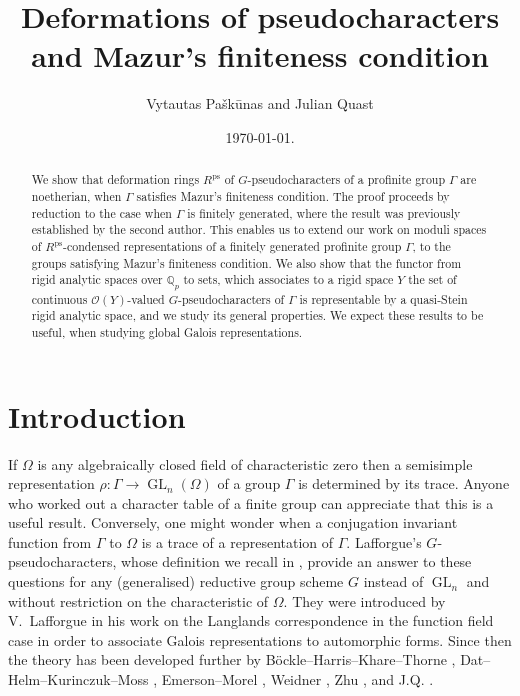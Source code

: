 \documentclass{amsart}
\title[Deformations of pseudocharacters]{Deformations of pseudocharacters and Mazur's finiteness condition}
\author{Vytautas Pa\v{s}k\={u}nas and  Julian Quast }
\date{\today.}
\theoremstyle{definition}
\theoremstyle{remark}
\DeclareMathOperator{\GL}{GL}
\newcommand{\Qp}{\mathbb {Q}_p}
\newcommand{\OO}{\mathcal O}
\newcommand{\ps}{\mathrm{ps}}
\begin{document}
 


\begin{abstract} We show that  deformation rings $R^{\ps}$ of $G$-pseudocharacters of a profinite group $\Gamma$ are noetherian, when $\Gamma$ satisfies Mazur's finiteness condition. The proof proceeds by reduction to the case when $\Gamma$ is finitely generated, where the result was previously established by the second author.  This enables us to extend our work on
moduli spaces of $R^{\ps}$-condensed representations of a finitely generated profinite group $\Gamma$, to the groups satisfying Mazur's 
finiteness condition. We also show that  the functor from rigid analytic spaces over 
$\Qp$ to sets, which associates to a rigid space $Y$ the set of continuous
$\OO(Y)$-valued $G$-pseudocharacters of $\Gamma$  is representable by a quasi-Stein rigid analytic space, and we study its general properties. 
We expect these results to be useful, when 
studying global Galois representations. 
\end{abstract}
\maketitle

\tableofcontents
\section{Introduction}

If $\Omega$ is any algebraically closed field of characteristic zero then a
semisimple representation $\rho: \Gamma \rightarrow \GL_n(\Omega)$ of a group $\Gamma$ is 
determined by its trace. Anyone who worked out a character table of a finite group
can appreciate that this is a useful result. Conversely, one might wonder when 
a conjugation invariant function from $\Gamma$ to $\Omega$ is a trace of a representation 
of $\Gamma$. Lafforgue's $G$-pseudocharacters, whose definition we recall in , provide an answer to these questions 
for any (generalised) reductive group scheme $G$ instead of $\GL_n$ and without restriction on the characteristic of $\Omega$. They were introduced by V.~Lafforgue in
his work \cite{Laf} on the Langlands correspondence in the function field case  in order to associate Galois representations to automorphic forms. Since then the theory 
has been developed further by B\"ockle--Harris--Khare--Thorne \cite{BHKT}, Dat--Helm--Kurinczuk--Moss \cite{DHKM}, Emerson--Morel \cite{emerson2023comparison}, 
Weidner \cite{weidner}, Zhu \cite{zhu_coherent},
 and J.Q. \cite{quast}.
\end{document}
